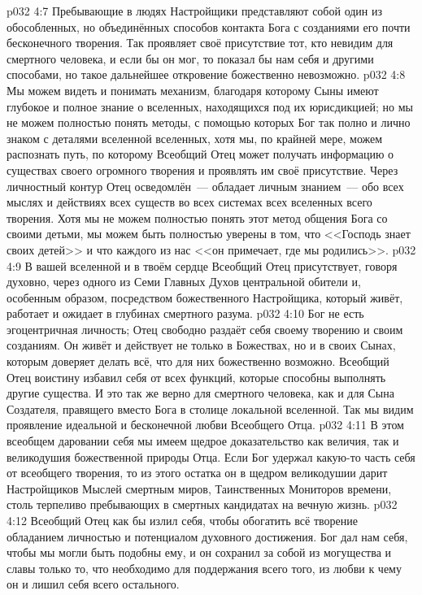 \vs p032 4:7 Пребывающие в людях Настройщики представляют собой один из обособленных, но объединённых способов контакта Бога с созданиями его почти бесконечного творения. Так проявляет своё присутствие тот, кто невидим для смертного человека, и если бы он мог, то показал бы нам себя и другими способами, но такое дальнейшее откровение божественно невозможно.
\vs p032 4:8 Мы можем видеть и понимать механизм, благодаря которому Сыны имеют глубокое и полное знание о вселенных, находящихся под их юрисдикцией; но мы не можем полностью понять методы, с помощью которых Бог так полно и лично знаком с деталями вселенной вселенных, хотя мы, по крайней мере, можем распознать путь, по которому Всеобщий Отец может получать информацию о существах своего огромного творения и проявлять им своё присутствие. Через личностный контур Отец осведомлён~--- обладает личным знанием~--- обо всех мыслях и действиях всех существ во всех системах всех вселенных всего творения. Хотя мы не можем полностью понять этот метод общения Бога со своими детьми, мы можем быть полностью уверены в том, что <<Господь знает своих детей>> и что каждого из нас <<он примечает, где мы родились>>.
\vs p032 4:9 \pc В вашей вселенной и в твоём сердце Всеобщий Отец присутствует, говоря духовно, через одного из Семи Главных Духов центральной обители и, особенным образом, посредством божественного Настройщика, который живёт, работает и ожидает в глубинах смертного разума.
\vs p032 4:10 \pc Бог не есть эгоцентричная личность; Отец свободно раздаёт себя своему творению и своим созданиям. Он живёт и действует не только в Божествах, но и в своих Сынах, которым доверяет делать всё, что для них божественно возможно. Всеобщий Отец воистину избавил себя от всех функций, которые способны выполнять другие существа. И это так же верно для смертного человека, как и для Сына Создателя, правящего вместо Бога в столице локальной вселенной. Так мы видим проявление идеальной и бесконечной любви Всеобщего Отца.
\vs p032 4:11 В этом всеобщем даровании себя мы имеем щедрое доказательство как величия, так и великодушия божественной природы Отца. Если Бог удержал какую\hyp{}то часть себя от всеобщего творения, то из этого остатка он в щедром великодушии дарит Настройщиков Мыслей смертным миров, Таинственных Мониторов времени, столь терпеливо пребывающих в смертных кандидатах на вечную жизнь.
\vs p032 4:12 Всеобщий Отец как бы излил себя, чтобы обогатить всё творение обладанием личностью и потенциалом духовного достижения. Бог дал нам себя, чтобы мы могли быть подобны ему, и он сохранил за собой из могущества и славы только то, что необходимо для поддержания всего того, из любви к чему он и лишил себя всего остального.
